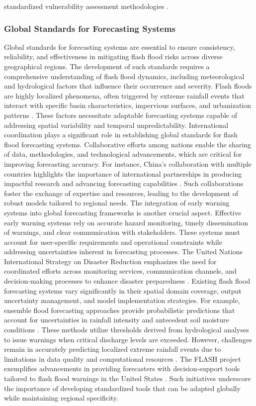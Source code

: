 standardized vulnerability assessment methodologies \citep{Kim2011}.
\subsubsection{Global Standards for Forecasting Systems}
Global standards for forecasting systems are essential to ensure consistency, reliability, and effectiveness in mitigating flash flood risks across diverse geographical regions. The development of such standards requires a comprehensive understanding of flash flood dynamics, including meteorological and hydrological factors that influence their occurrence and severity. Flash floods are highly localized phenomena, often triggered by extreme rainfall events that interact with specific basin characteristics, impervious surfaces, and urbanization patterns \citep{Saad2024}\citep{Yussouf2020}. These factors necessitate adaptable forecasting systems capable of addressing spatial variability and temporal unpredictability. International coordination plays a significant role in establishing global standards for flash flood forecasting systems. Collaborative efforts among nations enable the sharing of data, methodologies, and technological advancements, which are critical for improving forecasting accuracy. For instance, China's collaboration with multiple countries highlights the importance of international partnerships in producing impactful research and advancing forecasting capabilities \citep{Hinge2024}. Such collaborations foster the exchange of expertise and resources, leading to the development of robust models tailored to regional needs. The integration of early warning systems into global forecasting frameworks is another crucial aspect. Effective early warning systems rely on accurate hazard monitoring, timely dissemination of warnings, and clear communication with stakeholders. These systems must account for user-specific requirements and operational constraints while addressing uncertainties inherent in forecasting processes. The United Nations International Strategy on Disaster Reduction emphasizes the need for coordinated efforts across monitoring services, communication channels, and decision-making processes to enhance disaster preparedness \citep{Jubach2016}. Existing flash flood forecasting systems vary significantly in their spatial domain coverage, output uncertainty management, and model implementation strategies. For example, ensemble flood forecasting approaches provide probabilistic predictions that account for uncertainties in rainfall intensity and antecedent soil moisture conditions \citep{Luong2021}\citep{Naulin2013}. These methods utilize thresholds derived from hydrological analyses to issue warnings when critical discharge levels are exceeded. However, challenges remain in accurately predicting localized extreme rainfall events due to limitations in data quality and computational resources \citep{Hinge2024}. The FLASH project exemplifies advancements in providing forecasters with decision-support tools tailored to flash flood warnings in the United States \citep{Flamig2020}. Such initiatives underscore the importance of developing standardized tools that can be adapted globally while maintaining regional specificity. 